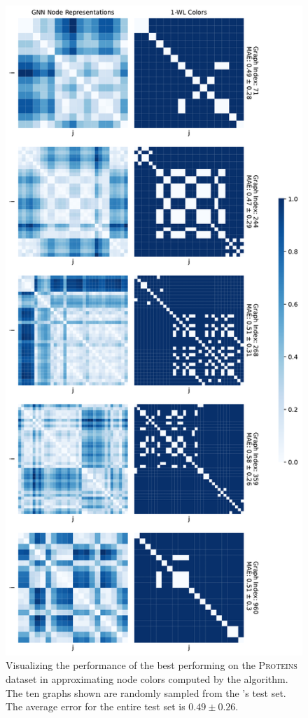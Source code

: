 \begin{figure}[H]
\begin{minipage}[b]{0.45992852703\textwidth}
    \end{minipage}
    \hfill
    \begin{minipage}[b]{0.53007147296\textwidth}
        \includegraphics[width=\textwidth, right]{Figures/heatmaps_PROTEINS_1.pdf}
    \end{minipage}
    \hfill
    \caption{Visualizing the performance of the best performing \gnn on the \textsc{Proteins} dataset in approximating node colors computed by the \wl algorithm. The ten graphs shown are randomly sampled from the \gnn's test set. The average error for the entire test set is $0.49 \pm 0.26$.}
    \label{fig:gnn_approx_proteins}
\end{figure}
\clearpage

